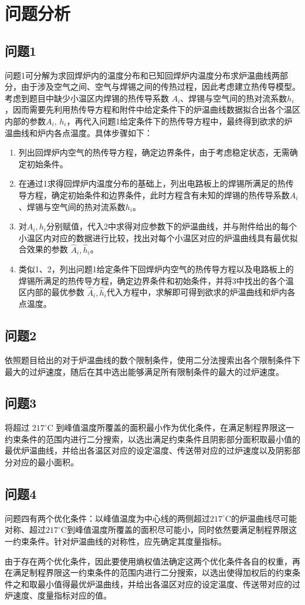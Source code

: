 \documentclass[../main.tex]{subfiles}
\begin{document}
\section{问题分析}

\subsection{问题1}
问题1可分解为求回焊炉内的温度分布和已知回焊炉内温度分布求炉温曲线两部分，由于涉及空气之间、空气与焊锡之间的传热过程，因此考虑建立热传导模型。考虑到题目中缺少小温区内焊锡的热传导系数 \(A_i\)、焊锡与空气间的热对流系数\(h_i\)，因而需要先利用热传导方程和附件中给定条件下的炉温曲线数据拟合出各个温区内部的参数\(A_{i}\), \(h_{i}\)，再代入问题1给定条件下的热传导方程中，最终得到欲求的炉温曲线和炉内各点温度。具体步骤如下：
\begin{enumerate}
\item 列出回焊炉内空气的热传导方程，确定边界条件，由于考虑稳定状态，无需确定初始条件。
\item 在通过1求得回焊炉内温度分布的基础上，列出电路板上的焊锡所满足的热传导方程，确定初始条件和边界条件，此时方程含有未知的焊锡的热传导系数\(A_{i}\)、焊锡与空气间的热对流系数\(h_{i}\)。
\item 对\(A_{i}, h_{i}\)分别赋值，代入2中求得对应参数下的炉温曲线，并与附件给出的每个小温区内对应的数据进行比较，找出对每个小温区对应的炉温曲线具有最优拟合效果的参数 \(\hat A _{i} , \hat h_{i}\)。
\item 类似1、2，列出问题1给定条件下回焊炉内空气的热传导方程以及电路板上的焊锡所满足的热传导方程，确定边界条件和初始条件，并将3中找出的各个温区内部的最优参数 \(\hat A _{i} , \hat h _{i}\)代入方程中，求解即可得到欲求的炉温曲线和炉内各点温度。
\end{enumerate}

\subsection{问题2}
依照题目给出的对于炉温曲线的数个限制条件，使用二分法搜索出各个限制条件下最大的过炉速度，随后在其中选出能够满足所有限制条件的最大的过炉速度。

\subsection{问题3}
将超过 \(217 ^{\circ}\mathrm{C}\) 到峰值温度所覆盖的面积最小作为优化条件，在满足制程界限这一约束条件的范围内进行二分搜索，以选出满足约束条件且阴影部分面积取最小值的最优炉温曲线，并给出各温区对应的设定温度、传送带对应的过炉速度以及阴影部分对应的最小面积。

\subsection{问题4}
问题四有两个优化条件：以峰值温度为中心线的两侧超过\(217 ^{\circ}\mathrm{C}\)的炉温曲线尽可能对称、超过\(217 ^{\circ}\mathrm{C}\)到峰值温度所覆盖的面积尽可能小，同时依然要满足制程界限这一约束条件。针对炉温曲线的对称性，应先确定其度量指标。

由于存在两个优化条件，因此要使用熵权值法确定这两个优化条件各自的权重，再在满足制程界限这一约束条件的范围内进行二分搜索，以选出使得加权后的约束条件之和取最小值得最优炉温曲线，并给出各温区对应的设定温度、传送带对应的过炉速度、度量指标对应的值。
\end{document}
